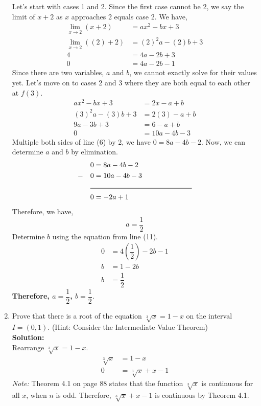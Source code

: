 \documentclass[12pt]{book}
\begin{document}
\begin{enumerate}
Let's start with cases 1 and 2. Since the first case cannot be 2, we say the limit of $x+2$ as $x$ approaches 2 equals case 2. We have,
\begin{align}
    \lim_{x\to 2}\limits (x+2) &= ax^2 - bx + 3 \\
    \lim_{x\to 2}\limits ((2)+2) &= (2)^2a - (2)b + 3 \\
    4 &= 4a - 2b + 3 \\
    0 &= 4a - 2b - 1
\end{align}
Since there are two variables, $a$ and $b$, we cannot exactly solve for their values yet. Let's move on to cases 2 and 3 where they are both equal to each other at $f(3)$.
\begin{align}
    ax^2-bx+3 &= 2x-a+b \\
    (3)^2a-(3)b+3 &= 2(3)-a+b \\
    9a-3b+3 &= 6-a+b \\
    0 &= 10a -4b -3
\end{align}
Multiple both sides of line (6) by 2, we have $0 = 8a-4b-2$. Now, we can determine $a$ and $b$ by elimination.
\begin{align}
    &0 = 8a - 4b - 2 \\
    - \quad &0 = 10a -4b -3 \\
    &\rule{5cm}{0.5pt}\\
    &0 = -2a+1
\end{align}
Therefore, we have,
    $$a = \dfrac{1}{2}$$
Determine $b$ using the equation from line (11).
\begin{align}
    0 &= 4\left(\dfrac{1}{2}\right) - 2b - 1 \\
    b &= 1-2b \\
    b &= \dfrac{1}{2}
\end{align}
\textbf{Therefore, $a = \dfrac{1}{2}$, \quad $b = \dfrac{1}{2}$}.







\newpage


\item Prove that there is a root of the equation $\sqrt[3]{x}=1-x$ on the interval $I=(0,1)$. (Hint: Consider the Intermediate Value Theorem) \\

\textbf{Solution:}\\
\setcounter{equation}{0}
Rearrange $\sqrt[3]{x}=1-x$.
\begin{align}
    \sqrt[3]{x} &= 1-x \\
    0 &= \sqrt[3]{x} +x - 1
\end{align}
\textit{Note:} Theorem 4.1 on page 88 states that the function $\sqrt[3]{x}$ is continuous for all $x$, when $n$ is odd. Therefore, $\sqrt[3]{x} +x - 1$ is continuous by Theorem 4.1.\\\\


\end{enumerate}
\end{document}
